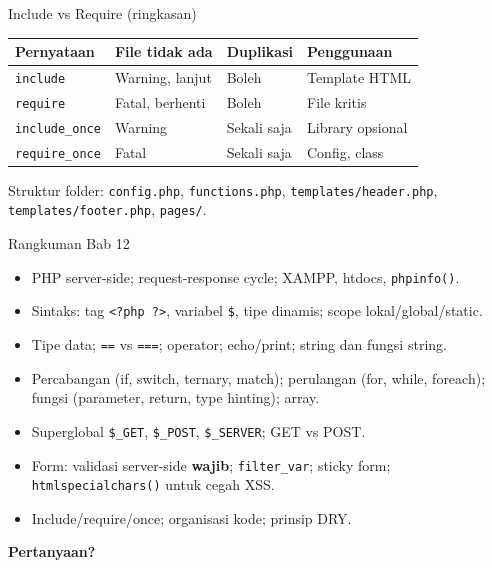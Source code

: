 \documentclass[handout]{beamer}
\begin{document}
\begin{frame}{Include vs Require (ringkasan)}
	\small
	\begin{tabular}{|l|l|l|l|}
		\hline
		\textbf{Pernyataan} & \textbf{File tidak ada} & \textbf{Duplikasi} & \textbf{Penggunaan} \\
		\hline
		\texttt{include} & Warning, lanjut & Boleh & Template HTML \\
		\hline
		\texttt{require} & Fatal, berhenti & Boleh & File kritis \\
		\hline
		\texttt{include\_once} & Warning & Sekali saja & Library opsional \\
		\hline
		\texttt{require\_once} & Fatal & Sekali saja & Config, class \\
		\hline
	\end{tabular}
	\vspace{0.5em}
	Struktur folder: \texttt{config.php}, \texttt{functions.php}, \texttt{templates/header.php}, \texttt{templates/footer.php}, \texttt{pages/}.
\end{frame}

\begin{frame}{Rangkuman Bab 12}
	\begin{itemize}
		\item PHP server-side; request-response cycle; XAMPP, htdocs, \texttt{phpinfo()}.
		\item Sintaks: tag \texttt{<?php ?>}, variabel \texttt{\$}, tipe dinamis; scope lokal/global/static.
		\item Tipe data; \texttt{==} vs \texttt{===}; operator; echo/print; string dan fungsi string.
		\item Percabangan (if, switch, ternary, match); perulangan (for, while, foreach); fungsi (parameter, return, type hinting); array.
		\item Superglobal \texttt{\$\_GET}, \texttt{\$\_POST}, \texttt{\$\_SERVER}; GET vs POST.
		\item Form: validasi server-side \textbf{wajib}; \texttt{filter\_var}; sticky form; \texttt{htmlspecialchars()} untuk cegah XSS.
		\item Include/require/once; organisasi kode; prinsip DRY.
	\end{itemize}
\end{frame}

\begin{frame}{}
	\centering
	\vfill
	\textbf{\Large Pertanyaan?}
	\vfill
\end{frame}
\end{document}
